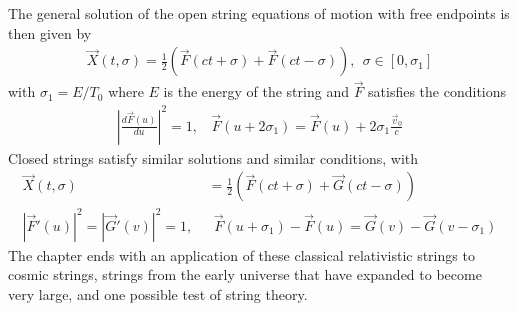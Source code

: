 \documentclass[11pt]{article}
\begin{document}
The general solution of the open string equations of motion with free endpoints is then given by 
\begin{align*}
    \vec{X}(t, \sigma) = \frac{1}{2} (\vec{F}(ct + \sigma) + \vec{F}(ct - \sigma)), ~~ \sigma \in [0, \sigma_1] \tag{7.47}
\end{align*} 
with $\sigma_1 = E/T_0$ where $E$ is the energy of the string and $\vec{F}$ satisfies the conditions
\begin{align*}
    \left| \frac{d\vec{F}(u)}{du} \right|^2 = 1, ~~~~ \vec{F}(u + 2\sigma_1) = \vec{F}(u) + 2\sigma_1 \frac{\vec{v}_0}{c} \tag{7.48}
\end{align*}
Closed strings satisfy similar solutions and similar conditions, with 
\begin{align*}
    \vec{X}(t, \sigma) &= \frac{1}{2}(\vec{F}(ct + \sigma) + \vec{G}(ct - \sigma)) \tag{7.65} \\
    |\vec{F}'(u)|^2 = |\vec{G}'(v)|^2 = 1, ~&~~ \vec{F}(u + \sigma_1) - \vec{F}(u) = \vec{G}(v) - \vec{G}(v - \sigma_1) \tag{7.70, 7.74}
\end{align*}
The chapter ends with an application of these classical relativistic strings to cosmic strings, strings from the early universe that have expanded to become very large, and one possible test of string theory. 
\newpage 
\end{document}
